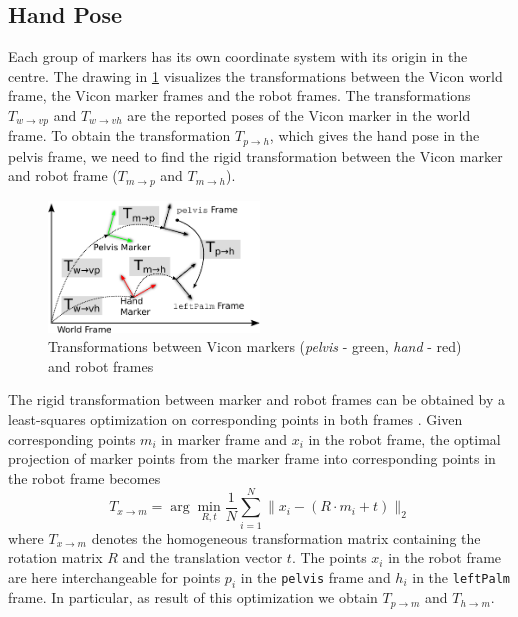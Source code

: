 \subsection{Hand Pose}

Each group of markers has its own coordinate system with its origin in the centre.
The drawing in \cref{fig:transform_vicon_robot} visualizes the transformations between the Vicon world frame, the Vicon marker frames and the robot frames.
The transformations $T_{w \rightarrow vp}$ and $T_{w \rightarrow vh}$ are the reported poses of the Vicon marker in the world frame.
To obtain the transformation $T_{p \rightarrow h}$, which gives the hand pose in the pelvis frame, we need to find the rigid transformation between the Vicon marker and robot frame ($T_{m \rightarrow p}$ and $T_{m \rightarrow h}$).

\begin{figure}
\captionsetup{width=0.52\textwidth}
\centering
\includegraphics[width=0.5\textwidth]{images/vicon_pose/vicon_transforms.pdf}
\caption[Transformations of Vicon markers]{Transformations between Vicon markers (\textit{pelvis} - green, \textit{hand} - red) and robot frames}
\label{fig:transform_vicon_robot}
\end{figure}

The rigid transformation between marker and robot frames can be obtained by a least-squares optimization on corresponding points in both frames \cite{Umeyama1991}. Given corresponding points $m_i$ in marker frame and $x_i$ in the robot frame, the optimal projection of marker points from the marker frame into corresponding points in the robot frame becomes
\begin{equation}
T_{x \rightarrow m} = \arg\min_{R,t} \frac{1}{N} \sum_{i=1}^N \lVert x_i - \left( R \cdot m_i + t \right) \rVert_2
\label{eqn:least_squares_transformation_estimation}
\end{equation}
where $T_{x \rightarrow m}$ denotes the homogeneous transformation matrix containing the rotation matrix $R$ and the translation vector $t$. The points $x_i$ in the robot frame are here interchangeable for points $p_i$ in the \texttt{pelvis} frame and $h_i$ in the \texttt{leftPalm} frame. In particular, as result of this optimization we obtain $T_{p \rightarrow m}$ and $T_{h \rightarrow m}$.


